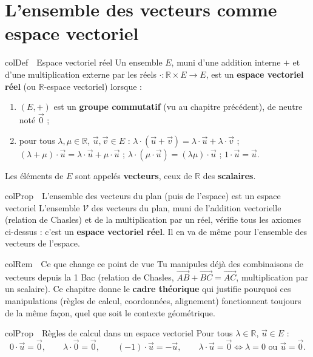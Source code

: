 \documentclass[11pt,a4paper]{article}
\newenvironment{definition}[1][Définition]
  {\begin{fiche}{colDef}{\ding{110}~~#1}}{\end{fiche}}
\newenvironment{propriete}[1][Propriété]
  {\begin{fiche}{colProp}{\ding{72}~~#1}}{\end{fiche}}
\newenvironment{remarque}[1][Remarque]
  {\begin{fiche}{colRem}{\ding{43}~~#1}}{\end{fiche}}
\begin{document}
\section{L'ensemble des vecteurs comme espace vectoriel}

\begin{definition}[Espace vectoriel réel]
Un ensemble $E$, muni d'une addition interne $+$ et d'une multiplication externe par les réels $\cdot:\mathbb{R}\times E\to E$, est un \textbf{espace vectoriel réel} (ou $\mathbb{R}$-espace vectoriel) lorsque :
\begin{enumerate}[leftmargin=7mm, itemsep=0.5mm]
  \item $(E,+)$ est un \textbf{groupe commutatif} (vu au chapitre précédent), de neutre noté $\vec0$ ;
  \item pour tous $\lambda,\mu\in\mathbb{R}$, $\vec u,\vec v\in E$ : $\lambda\cdot(\vec u+\vec v)=\lambda\cdot\vec u+\lambda\cdot\vec v$ ; $(\lambda+\mu)\cdot\vec u=\lambda\cdot\vec u+\mu\cdot\vec u$ ; $\lambda\cdot(\mu\cdot\vec u)=(\lambda\mu)\cdot\vec u$ ; $1\cdot\vec u=\vec u$.
\end{enumerate}
Les éléments de $E$ sont appelés \textbf{vecteurs}, ceux de $\mathbb{R}$ des \textbf{scalaires}.
\end{definition}

\begin{propriete}[L'ensemble des vecteurs du plan (puis de l'espace) est un espace vectoriel]
L'ensemble $\mathcal{V}$ des vecteurs du plan, muni de l'addition vectorielle (relation de Chasles) et de la multiplication par un réel, vérifie tous les axiomes ci-dessus : c'est un \textbf{espace vectoriel réel}. Il en va de même pour l'ensemble des vecteurs de l'espace.
\end{propriete}

\begin{remarque}[Ce que change ce point de vue]
Tu manipules déjà des combinaisons de vecteurs depuis la 1 Bac (relation de Chasles, $\overrightarrow{AB}+\overrightarrow{BC}=\overrightarrow{AC}$, multiplication par un scalaire). Ce chapitre donne le \textbf{cadre théorique} qui justifie pourquoi ces manipulations (règles de calcul, coordonnées, alignement) fonctionnent toujours de la même façon, quel que soit le contexte géométrique.
\end{remarque}

\begin{propriete}[Règles de calcul dans un espace vectoriel]
Pour tous $\lambda\in\mathbb{R}$, $\vec u\in E$ :
\[
  0\cdot\vec u = \vec0, \qquad \lambda\cdot\vec0=\vec0, \qquad (-1)\cdot\vec u=-\vec u, \qquad \lambda\cdot\vec u=\vec0 \iff \lambda=0 \text{ ou } \vec u=\vec0.
\]
\end{propriete}
\end{document}
